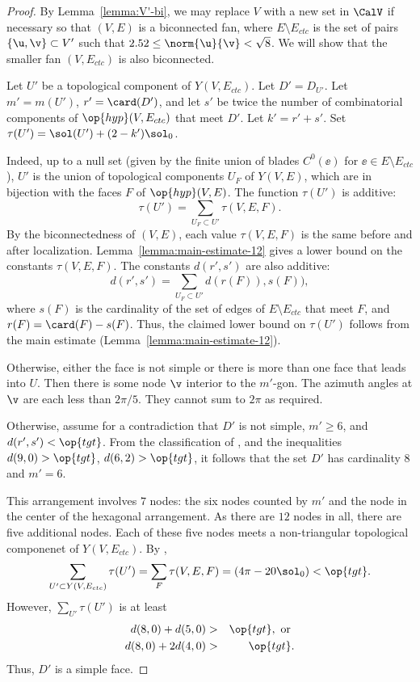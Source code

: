 \begin{proof}
  By Lemma~\ref{lemma:V'-bi}, we may replace $V$ with a new set in
  $\CalV$ if necessary so that $(V,E)$ is a biconnected fan, where
  $E\setminus E_{ctc}$ is the set of pairs $\{\u,\v\}\subset V'$ such
  that $2.52\le\norm{\u}{\v} <\sqrt8$.  We will show that the smaller
  fan $(V,E_{ctc})$ is also biconnected.

Let $U'$ be a topological component of $Y(V,E_{ctc})$.  Let $D'=D_{U'}$.
Let $m'=m(U')$, $r' = \card(D')$, and
let $s'$ be twice the number of combinatorial components of $\op{hyp}(V,E_{ctc})$
that meet $D'$.  Let $k'=r'+s'$.  Set $\tau(U') = \sol(U') + (2-k')\sol_0$.

Indeed, up to a null set (given by the finite
union of blades $C^0(\ee)$ for $\ee\in E\setminus E_{ctc}$), 
$U'$ is the union of topological components $U_F$ of $Y(V,E)$, which are in bijection
with the faces $F$ of $\op{hyp}(V,E)$.  The function $\tau(U')$ is additive:
\[
\tau(U') = \sum_{U_F\subset U'} \tau(V,E,F).
\]
By the biconnectedness of $(V,E)$, each value $\tau(V,E,F)$ is the same before and after
localization.  Lemma~\ref{lemma:main-estimate-12} gives a lower bound on the
constants $\tau(V,E,F)$.  The constants $d(r',s')$ are also additive:
\[
d(r',s') = \sum_{U_F\subset U'} d(r(F)),s(F)),
\]
where $s(F)$ is the cardinality of the set of edges of $E\setminus E_{ctc}$ that meet $F$,
and $r(F) = \card(F)-s(F)$.
Thus, the claimed lower bound on $\tau(U')$ follows from the main estimate (Lemma~\ref{lemma:main-estimate-12}).


 Otherwise,
either the face is not
  simple or there is more than one face that leads into $U$.  Then
  there is some node $\v$ interior to the $m'$-gon.  The azimuth
  angles at $\v$ are each less than $2\pi/5$. They cannot sum to
  $2\pi$ as required.

  Otherwise, assume for a contradiction
that $D'$ is not simple,  $m'\ge 6$, and $d(r',s')<\op{tgt}$.
  From the classification of \cite[p.~126,~Fig.~12.1]{Hales:2006:DCG},
  and the inequalities $d(9,0) > \op{tgt}$, $d(6,2) > \op{tgt}$, it
  follows that the set $D'$ has cardinality $8$ and $m'=6$.

This arrangement involves $7$ nodes: the six
  nodes counted by $m'$ and the node in the center of the hexagonal
  arrangement.  As there are $12$ nodes in all, there are five
  additional nodes.  Each of these five nodes meets a non-triangular
  topological componenet of $Y(V,E_{ctc})$.  By , 
\begin{displaymath}
  \sum_{U'\subset Y(V,E_{ctc})} \tau(U') =\sum_F \tau(V,E,F) = (4\pi - 20\sol_0) < \op{tgt}.
\end{displaymath}
However, $\sum_{U'} \tau(U')$ is at least
\begin{eqnarray*}
d(8,0) + d(5,0) &>& \op{tgt}, \text{ or }\\
d(8,0) + 2 d(4,0) &>& \op{tgt}.
\end{eqnarray*}
Thus, $D'$ is a simple face.
%
%


\end{proof}

